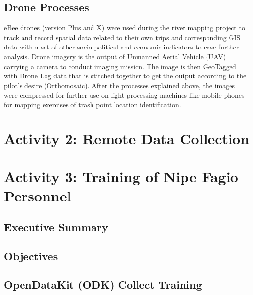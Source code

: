 \documentclass[a4paper,12pt,twoside]{article}
\begin{document}
\subsection{Drone Processes}

    \begin{multicols}{2}
    eBee drones (version Plus and X) were used during the river mapping project to track and record spatial data related to their own trips and corresponding GIS data with a set of other socio-political and economic indicators to ease further analysis. Drone imagery is the output of Unmanned Aerial Vehicle (UAV) carrying a camera to conduct imaging mission. The image is then GeoTagged with Drone Log data that is stitched together to get the output according to the pilot’s desire (Orthomosaic). After the processes explained above, the images were compressed for further use on light processing machines like mobile phones for mapping exercises of trash point location identification.
    \end{multicols}
    
\section{Activity 2: Remote Data Collection}

\section{Activity 3: Training of Nipe Fagio Personnel}

\subsection{Executive Summary}

    \begin{multicols}{2}
    \lipsum[0-5]
    \end{multicols}

\subsection{Objectives}

    \begin{multicols}{2}
    \lipsum[0-5]
    \end{multicols}

\subsection{OpenDataKit (ODK) Collect Training}
\end{document}
